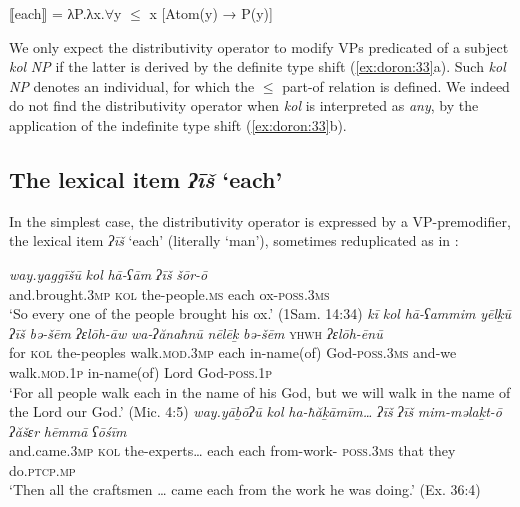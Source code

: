 \documentclass[output=paper]{langsci/langscibook}
\begin{document}
\ea%
    \label{ex:doron:45}\relax
    $⟦$each$⟧$  =   λP.λx.${\forall}$y ${\leq}$ x [Atom(y) → P(y)]
\z


We only expect the distributivity operator to modify VPs predicated of a subject \textit{kol} \textit{NP} if the latter is derived by the definite type shift (\ref{ex:doron:33}a). Such \textit{kol} \textit{NP} denotes an individual, for which the ${\leq}$  part-of relation is defined. We indeed do not find the distributivity operator when \textit{kol} is interpreted as \textit{any}, by the application of the indefinite type shift (\ref{ex:doron:33}b).

\subsection{The lexical item \textit{ʔīš} ‘each’}%
In the simplest case, the distributivity operator is expressed by a VP-premodifier, the lexical item \textit{ʔīš} ‘each’ (literally ‘man’), sometimes reduplicated as in :

\ea%
    \label{ex:doron:46}
    \ea
    \gll \textit{way.yaggīšū}          \textit{kol}    \textit{hā-ʕām}              \textit{ʔīš}     \textit{šōr-ō}                  \\
         and.brought\textsc{.3mp}   \textsc{kol} the-people.\textsc{ms}   each  ox-\textsc{poss.3ms}   \\
    \glt `So every one of the people brought his ox.' (1Sam. 14:34)
    \ex
    \gll \textit{kī}   \textit{kol}    \textit{hā-ʕammim}   \textit{yēlḵū}                   \textit{ʔīš}      \textit{bə-šēm}         \textit{ʔɛlōh-āw} \textit{wa-ʔănaħnū} \textit{nēlēḵ}                \textit{bə-šēm}        \textsc{yhwh}  \textit{ʔɛlōh-ēnū}\\
         for \textsc{kol}   the-peoples   walk.\textsc{mod.3mp}   each   in-name(of)  God-\textsc{poss.3ms} and-we         walk.\textsc{mod.1p}   in-name(of) Lord   God-\textsc{poss.1p}\\
    \glt `For all people walk each in the name of his God, but we will walk in the name of the Lord our God.' (Mic. 4:5)
    \z
\ex %
    \label{ex:doron:47}
    \gll \textit{way.yāḇōʔū}      \textit{kol}   \textit{ha-ħăḵāmīm…} \textit{ʔīš}     \textit{ʔīš}    \textit{mim-məlaḵt-ō}             \textit{ʔăšɛr}  \textit{hēmmā}  \textit{ʕōśīm}\\
         and.came\textsc{.3mp}  \textsc{kol} the-experts…   each each from-work- \textsc{poss.3ms} that    they       do.\textsc{ptcp.mp}\\
    \glt `Then all the craftsmen … came each from the work he was doing.' (Ex. 36:4)
\z
\end{document}
